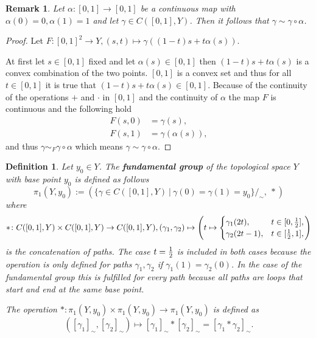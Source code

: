 \documentclass[a4paper, 11pt, twoside]{article}
\theoremstyle{break}
\theoremstyle{break}
\newtheorem{defin}[thm]{Definition}
\newtheorem{rem}[thm]{Remark}
\begin{document}
\begin{rem} \label{rem:reparam}
  Let $\alpha: [0,1] \to [0,1]$ be a continuous map with $\alpha(0) = 0, \alpha(1) = 1$ and let $\gamma \in C([0,1], Y)$. Then it follows that $\gamma \sim \gamma \circ \alpha$.
\end{rem}

\begin{proof}
  Let $F\colon [0,1]^2 \to Y, (s, t) \mapsto \gamma((1 - t)s + t\alpha(s))$.

  At first let $s \in [0,1]$ fixed and let $\alpha(s) \in [0,1]$ then $(1 - t)s + t\alpha(s)$ is a convex combination of the two points. 
  $[0,1]$ is a convex set and thus for all $t\in[0,1]$ it is true that $(1 - t)s + t\alpha(s) \in [0,1]$. Because of the continuity of the operations $+$ and $\cdot$ in $[0,1]$ 
  and the continuity of $\alpha$ the map $F$ is continuous and the following hold
  \begin{align*}
    F(s, 0) &= \gamma(s), \\
    F(s, 1) &= \gamma(\alpha(s)),
  \end{align*}
  and thus $\gamma \sim_F \gamma \circ \alpha$ which means $\gamma \sim \gamma \circ \alpha$.
\end{proof}

\begin{defin}
  Let $y_0 \in Y$. The \textbf{fundamental group} of the topological space $Y$ with base point $y_0$ is defined as follows
  \begin{equation*}
    \pi_1(Y, y_0) := (\{\gamma \in C([0,1],Y) \: | \: \gamma(0) = \gamma(1) = y_0\}/_{\sim}, \: *)
  \end{equation*}
  where 
  \begin{equation*} 
    *\colon C([0,1], Y) \times C([0,1], Y) \to C([0,1], Y), (\gamma_1, \gamma_2) \mapsto \left(t \mapsto \begin{cases}
    \gamma_1(2t),   &t \in [0, {1 \over 2}], \\
    \gamma_2(2t-1), &t \in [{1 \over 2}, 1],
  \end{cases}\right)
\end{equation*}
is the concatenation of paths. The case $t = {1\over2}$ is included in both cases because the operation is only defined for paths $\gamma_1, \gamma_2$ if $\gamma_1(1) = \gamma_2(0)$. 
In the case of the fundamental group this is fulfilled for every path because all paths are loops that start and end at the same base point.

The operation $*\colon \pi_1(Y, y_0) \times \pi_1(Y, y_0) \to \pi_1(Y, y_0)$ is defined as
\begin{equation*}
  ([\gamma_1]_{\sim}, [\gamma_2]_{\sim}) \mapsto [\gamma_1]_{\sim} * [\gamma_2]_{\sim} = [\gamma_1 * \gamma_2]_{\sim}.
\end{equation*} 
\end{defin}
\end{document}
